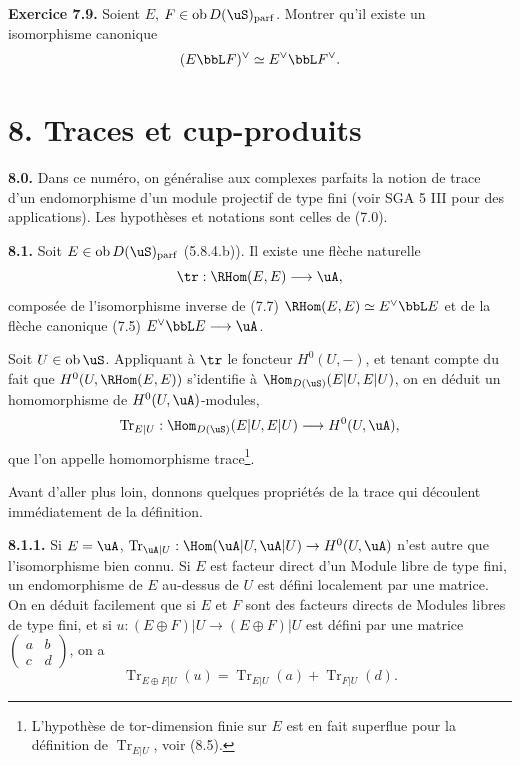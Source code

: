\bigskip
\noindent\textbf{Exercice 7.9.} Soient $E$, $F \in \operatorname{ob} D(\uS)_{\mathrm{parf}}$. Montrer qu'il existe un isomorphisme canonique
\[
(E \bbL F)^{\vee} \simeq E^{\vee} \bbL F^{\vee} .
\]


\section*{8. Traces et cup-produits}

\noindent\textbf{8.0.} Dans ce num\'{e}ro, on g\'{e}n\'{e}ralise aux complexes parfaits la notion de trace d'un endomorphisme d'un module projectif de type fini (voir SGA 5 III pour des applications). Les hypoth\`{e}ses et notations sont celles de (7.0).

\bigskip
\noindent\textbf{8.1.} Soit $E \in \operatorname{ob} D(\uS)_{\mathrm{parf}}$ (5.8.4.b)). Il existe une fl\`{e}che naturelle
\[
\tr : \RHom(E,E) \longrightarrow \uA ,
\]
compos\'{e}e de l'isomorphisme inverse de (7.7) $\RHom(E,E) \simeq E^{\vee} \bbL E$ et de la fl\`{e}che canonique (7.5) $E^{\vee} \bbL E \longrightarrow \uA$.

Soit $U \in \operatorname{ob} \uS$. Appliquant \`{a} $\tr$ le foncteur $H^0(U,-)$, et tenant compte du fait que $H^0(U, \RHom(E,E))$ s'identifie \`{a} $\Hom_{D(\uS)}(E|U, E|U)$, on en d\'{e}duit un homomorphisme de $H^0(U,\uA)$-modules,
\[
\operatorname{Tr}_{E|U} : \Hom_{D(\uS)}(E|U, E|U) \longrightarrow H^0(U,\uA) ,
\]
que l'on appelle homomorphisme trace\footnote{L'hypoth\`{e}se de tor-dimension finie sur $E$ est en fait superflue pour la d\'{e}finition de $\operatorname{Tr}_{E|U}$, voir (8.5).}.

Avant d'aller plus loin, donnons quelques propri\'{e}t\'{e}s de la trace qui d\'{e}coulent imm\'{e}diatement de la d\'{e}finition.

\smallskip
\noindent\textbf{8.1.1.} Si $E = \uA$, $\operatorname{Tr}_{\uA|U} : \Hom(\uA|U, \uA|U) \rightarrow H^0(U,\uA)$ n'est autre que l'isomorphisme bien connu. Si $E$ est facteur direct d'un Module libre de type fini, un endomorphisme de $E$ au-dessus de $U$ est d\'{e}fini localement par une matrice. On en d\'{e}duit facilement que si $E$ et $F$ sont des facteurs directs de Modules libres de type fini, et si $u : (E \oplus F)|U \rightarrow (E \oplus F)|U$ est d\'{e}fini par une matrice $\begin{pmatrix} a & b \\ c & d \end{pmatrix}$, on a
\[
\operatorname{Tr}_{E \oplus F|U}(u) = \operatorname{Tr}_{E|U}(a) + \operatorname{Tr}_{F|U}(d) .
\]

